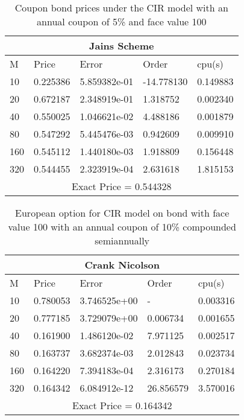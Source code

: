 \documentclass[11pt]{article}
\begin{document}
\begin{table}[htp]
\begin{tabular}{ |p{2cm}|p{3cm}|p{3cm}|p{3cm}|p{3cm}|  }
 \hline
 \multicolumn{5}{|c|}{Jains Scheme} \\
 \hline
 M & Price & Error & Order & cpu(s)\\
 \hline
10 & 0.225386 & 5.859382e-01 & -14.778130 & 0.149883\\
20 & 0.672187 & 2.348919e-01 & 1.318752 & 0.002340\\
40 & 0.550025 & 1.046621e-02 & 4.488186 & 0.001879\\
80 & 0.547292 & 5.445476e-03 & 0.942609 & 0.009910\\
160 & 0.545112 & 1.440180e-03 & 1.918809 & 0.156448\\
320 & 0.544455 & 2.323919e-04 & 2.631618 & 1.815153\\
 \hline
 \multicolumn{5}{|c|}{Exact Price = 0.544328} \\
 \hline
 
\end{tabular}
\caption{ Coupon bond prices under the CIR model with an annual coupon of 5\% and face value 100}

\end{table}


\begin{table}[htp]
\begin{tabular}{ |p{2cm}|p{3cm}|p{3cm}|p{3cm}|p{3cm}|  }
 \hline
 \multicolumn{5}{|c|}{Crank Nicolson} \\
 \hline
 M & Price & Error & Order & cpu(s)\\
 \hline
10 & 0.780053 & 3.746525e+00 &  - & 0.003316\\
20 & 0.777185 & 3.729079e+00 & 0.006734 & 0.001655\\
40 & 0.161900 & 1.486120e-02 & 7.971125 & 0.002517\\
80 & 0.163737 & 3.682374e-03 & 2.012843 & 0.023734\\
160 & 0.164220 & 7.394183e-04 & 2.316173 & 0.270184\\
320 & 0.164342 & 6.084912e-12 & 26.856579 & 3.570016\\
 \hline
 \multicolumn{5}{|c|}{Exact Price = 0.164342} \\
 \hline
 
\end{tabular}
\caption{ European option for CIR model on bond with face value 100 with an annual coupon of 10\% compounded semiannually}

\end{table}
\end{document}
